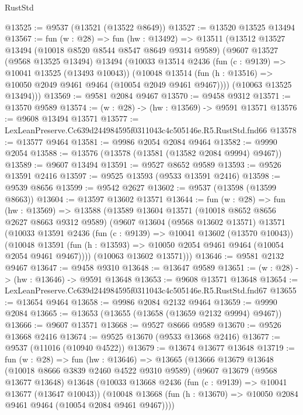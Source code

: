 \begin{lexlean}{RustStd}
\begin{coremodule}
@13525 := @9537 (@13521 (@13522 @8649))
@13527 := @13520 @13525 @13494
@13567 := fun (w : @28) =>
  fun (hw : @13492) =>
  @13511
    (@13512
      @13527
      @13494
      (@10018 @8520 @8544 @8547 @8649 @9314 @9589)
      (@9607
        @13527
        (@9568 @13525 @13494)
        @13494
        (@10033
          @13514
          @2436
          (fun (c : @9139) => @10041 @13525 (@13493 @10043))
          (@10048 @13514 (fun (h : @13516) => @10050 @2049 @9461 @9464 (@10054 @2049 @9461 @9467))))
        (@10063 @13525 @13494)))
@13569 := @9581 @2084 @9467
@13570 := @9458 @9312
@13571 := @13570 @9589
@13574 := (w : @28) -> (hw : @13569) -> @9591 @13571
@13576 := @9608 @13494 @13571
@13577 := LexLeanPreserve.Cc639d244984595f0311043c4c505146e.R5.RustStd.fnd66
@13578 := @13577 @9464
@13581 := @9986 @2054 @2084 @9464
@13582 := @9990 @2054
@13588 := @13576 (@13578 (@13581 (@13582 @2084 @9994) @9467))
@13589 := @9607 @13494
@13591 := @9527 @8652 @9589
@13593 := @9526 @13591 @2416
@13597 := @9525 @13593 (@9533 @13591 @2416)
@13598 := @9539 @8656
@13599 := @9542 @2627
@13602 := @9537 (@13598 (@13599 @8663))
@13604 := @13597 @13602 @13571
@13644 := fun (w : @28) =>
  fun (hw : @13569) =>
  @13588
    (@13589
      @13604
      @13571
      (@10018 @8652 @8656 @2627 @8663 @9312 @9589)
      (@9607
        @13604
        (@9568 @13602 @13571)
        @13571
        (@10033
          @13591
          @2436
          (fun (c : @9139) => @10041 @13602 (@13570 @10043))
          (@10048 @13591 (fun (h : @13593) => @10050 @2054 @9461 @9464 (@10054 @2054 @9461 @9467))))
        (@10063 @13602 @13571)))
@13646 := @9581 @2132 @9467
@13647 := @9458 @9310
@13648 := @13647 @9589
@13651 := (w : @28) -> (hw : @13646) -> @9591 @13648
@13653 := @9608 @13571 @13648
@13654 := LexLeanPreserve.Cc639d244984595f0311043c4c505146e.R5.RustStd.fnd67
@13655 := @13654 @9464
@13658 := @9986 @2084 @2132 @9464
@13659 := @9990 @2084
@13665 := @13653 (@13655 (@13658 (@13659 @2132 @9994) @9467))
@13666 := @9607 @13571
@13668 := @9527 @8666 @9589
@13670 := @9526 @13668 @2416
@13674 := @9525 @13670 (@9533 @13668 @2416)
@13677 := @9537 (@11016 (@10940 @4522))
@13679 := @13674 @13677 @13648
@13719 := fun (w : @28) =>
  fun (hw : @13646) =>
  @13665
    (@13666
      @13679
      @13648
      (@10018 @8666 @3839 @2460 @4522 @9310 @9589)
      (@9607
        @13679
        (@9568 @13677 @13648)
        @13648
        (@10033
          @13668
          @2436
          (fun (c : @9139) => @10041 @13677 (@13647 @10043))
          (@10048 @13668 (fun (h : @13670) => @10050 @2084 @9461 @9464 (@10054 @2084 @9461 @9467))))

\end{coremodule}
\end{lexlean}
